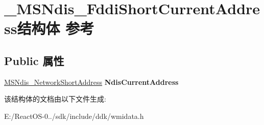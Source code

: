 \hypertarget{struct___m_s_ndis___fddi_short_current_address}{}\section{\+\_\+\+M\+S\+Ndis\+\_\+\+Fddi\+Short\+Current\+Address结构体 参考}
\label{struct___m_s_ndis___fddi_short_current_address}
\subsection*{Public 属性}
\begin{DoxyCompactItemize}
\item 
\mbox{\label{struct___m_s_ndis___fddi_short_current_address_aca958a96c28bbfb170df48fda5d3bb97}} 
\hyperlink{struct___m_s_ndis___network_short_address}{M\+S\+Ndis\+\_\+\+Network\+Short\+Address} {\bfseries Ndis\+Current\+Address}
\end{DoxyCompactItemize}


该结构体的文档由以下文件生成\+:\begin{DoxyCompactItemize}
\item 
E\+:/\+React\+O\+S-\/0../sdk/include/ddk/wmidata.\+h\end{DoxyCompactItemize}
